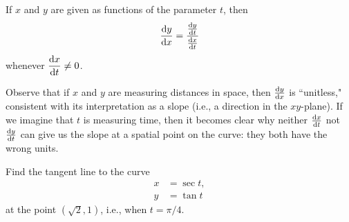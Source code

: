 

\begin{theorem}
If $x$ and $y$ are given as functions of the parameter $t$, then
\begin{equation*}
\frac{\mathrm{d} y}{\mathrm{d} x} = \frac{\frac{\mathrm{d} y}{\mathrm{d} t}}{\frac{\mathrm{d} x}{\mathrm{d} t}}
\end{equation*}
whenever $\displaystyle\frac{\mathrm{d} x}{\mathrm{d} t}\ne 0$.
\end{theorem}

\begin{remark}
Observe that if $x$ and $y$ are measuring distances in space, then $\frac{\mathrm{d} y}{\mathrm{d} x}$ is ``unitless," consistent with its interpretation as a slope (i.e., a direction in the $xy$-plane).
If we imagine that $t$ is measuring time, then it becomes clear why neither $\frac{\mathrm{d} x}{\mathrm{d} t}$ not $\frac{\mathrm{d} y}{\mathrm{d} t}$ can give us the slope at a spatial point on the curve: they both have the wrong units.
\end{remark}

\begin{example}
Find the tangent line to the curve
\begin{align*}
x &= \sec t,\\
y &= \tan t
\end{align*}
at the point $(\sqrt 2, 1)$, i.e., when $t=\pi/4$.
\end{example}
\ifdefined\SOLUTION
{}
\fi
\newpage

